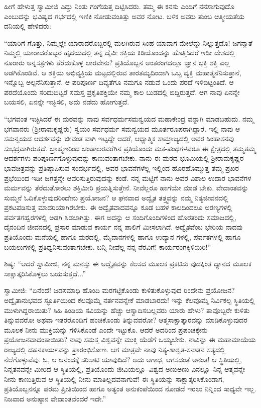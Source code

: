 ಹೀಗೆ ಹೇಳುತ್ತ ಸ್ವಾಮೀಜಿ ಎದ್ದು ನಿಂತು ಗಂಗೆಯತ್ತ ದಿಟ್ಟಿಸಿದರು. ತಮ್ಮ ಈ ಕನಸು ಎಂದಿಗೆ ನನಸಾಗುವುದೊ ಎಂಬುದನ್ನು ಭವಿಷ್ಯದ ಗರ್ಭದಲ್ಲಿ ಇಣಿಕಿ ನೋಡುವಂತಿತ್ತು ಅವರ ನೋಟ. ಬಳಿಕ ಅವರು ತುಂಬ ಆತ್ಮೀಯತೆಯ ದನಿಯಲ್ಲಿ ಹೇಳಿದರು:

“ಯಾರಿಗೆ ಗೊತ್ತು, ನಿಮ್ಮಲ್ಲೇ ಯಾರಾದರೊಬ್ಬರಲ್ಲಿ ಮಲಗಿರುವ ಸಿಂಹ ಯಾವಾಗ ಮೇಲೆದ್ದು ನಿಲ್ಲುತ್ತದೊ! ಜಗನ್ಮಾತೆ ನಿಮ್ಮಲ್ಲಿ ಯಾರಾದರೊಬ್ಬರ ಹೃದಯದಲ್ಲಿ ತನ್ನ ದೈವೀ ಶಕ್ತಿಯ ಕಿಡಿಯೊಂದನ್ನು ಹೊತ್ತಿಸಿದರೆ ಇಡೀ ದೇಶದಲ್ಲಿ ನೂರಾರು ಅನ್ನಸತ್ರಗಳು ತೆರೆದುಕೊಳ್ಳ ಲಾರವೇನು? ಪ್ರತಿಯೊಬ್ಬನ ಅಂತರಂಗದಲ್ಲೂ ಜ್ಞಾನ ಭಕ್ತಿ ಶಕ್ತಿ ಎಲ್ಲ ಅಡಗಿಕೊಂಡಿವೆ. ಆ ಶಕ್ತಿಯ ಅಭಿವ್ಯಕ್ತಿಯ ಮಟ್ಟದಲ್ಲಿರುವ ತಾರತಮ್ಯದಿಂದಾಗಿ ಒಬ್ಬ ವ್ಯಕ್ತಿ ಮಹಾತ್ಮನೆನಿಸುತ್ತಾನೆ, ಇನ್ನೊಬ್ಬ ಅಲ್ಪನೆನಿಸುತ್ತಾನೆ. ಆ ಪರಿಪೂರ್ಣ ದಿವ್ಯತೆಗೂ ನಮಗೂ ನಡುವೆ ಒಂದು ಪರದೆ ಇಳಿಬಿಟ್ಟಂತಿದೆ. ಆ ಪರದೆಯೊಂದು ಸರಿದುಬಿಟ್ಟರೆ ಸಮಸ್ತ ಪ್ರಕೃತಿಶಕ್ತಿಯೇ ನಮ್ಮ ಕಾಲ ಬುಡದಲ್ಲಿ ಬಿದ್ದಿರುತ್ತದೆ. ಆಗ ನಾವು ಏನನ್ನೇ ಬಯಸಲಿ, ಏನನ್ನೇ ಇಚ್ಛಿಸಲಿ, ಅದು ನಡೆದು ಹೋಗುತ್ತದೆ.

“ಭಗವಂತ ಇಚ್ಛಿಸಿದರೆ ಈ ಮಠವನ್ನು ನಾವು ಸರ್ವಧರ್ಮಸಮನ್ವಯದ ಮಹಾಕೇಂದ್ರ ವನ್ನಾಗಿ ಮಾಡಬಹುದು. ನಮ್ಮ ಭಗವಾನರು (ಶ್ರೀರಾಮಕೃಷ್ಣರು) ಸ್ವಯಂ ಸರ್ವಧರ್ಮ ಸಮನ್ವಯದ ಮೂರ್ತರೂಪರಾಗಿದ್ದಾರೆ. ಇಲ್ಲಿ ನಾವು ಆ ಸಮನ್ವಯದ ಆದರ್ಶವನ್ನು ಜೀವಂತ ವಾಗಿ ಇಟ್ಟದ್ದೇ ಆದರೆ, ಆಧ್ಯಾತ್ಮಿಕ ಸಾಮ್ರಾಜ್ಯದಲ್ಲಿ ಅವರ ಸಿಂಹಾಸನವು ಸುಭದ್ರವಾಗಿರುತ್ತದೆ. ಬ್ರಾಹ್ಮಣರಿಂದ ಚಂಡಾಲರವರೆಗಿನ ಪ್ರತಿಯೊಂದು ಮತ-ಪಂಥಗಳವರೂ ಈ ಕ್ಷೇತ್ರದಲ್ಲಿ ತಮ್ಮತಮ್ಮ ಆದರ್ಶಗಳು ಪರಿಪೂರ್ಣಗೊಳ್ಳುವುದನ್ನು ಕಾಣುವಂತಾಗಬೇಕು. ನಾನು ಈ ಮಠದ ಭೂಮಿಯಲ್ಲಿ ಶ್ರೀರಾಮಕೃಷ್ಣರ ಭಾವಚಿತ್ರವನ್ನು ಪ್ರತಿಷ್ಠಾಪಿಸುವ ಸಂದರ್ಭದಲ್ಲಿ, ಅವರ ಭಾವನೆಗಳೆಲ್ಲ ಇಲ್ಲಿಂದ ಹೊರಹೊಮ್ಮುತ್ತ ತಮ್ಮ ಪ್ರಖರ ಪ್ರಭೆಯಿಂದ ಇಡೀ ಜಗತ್ತನ್ನೇ ಆವರಿಸುತ್ತಿರುವುದನ್ನು ಕಂಡೆ. ನನ್ನ ಮಟ್ಟಿಗೆ ನಾನು ಅವರ ವಿಶಾಲ ಉದಾರ ಭಾವನೆಗಳ ಮರ್ಮವನ್ನು ತೆರೆದುತೋರಲು ಶಕ್ತಿಮೀರಿ ಪ್ರಯತ್ನಿಸುತ್ತೇನೆ. ನೀವೆಲ್ಲರೂ ಹಾಗೆಯೇ ಮಾಡ ಬೇಕು. ವೇದಾಂತವನ್ನು ಸುಮ್ಮನೆ ಓದಿಕೊಳ್ಳುವುದರಿಂದೇನು ಪ್ರಯೋಜನ? ಆ ಘನವಾದ ಅದ್ವೈತ ತತ್ತ್ವವನ್ನು ನಮ್ಮ ನಿತ್ಯಜೀವನದಲ್ಲಿ ಪ್ರಕಟಪಡಿಸುತ್ತ ಮಾದರಿಯಾಗಿರಬೇಕು. ಈ ಅದ್ವೈತವಾದವನ್ನೂ ಕೂಡ ಬಹಳ ಕಾಲದಿಂದಲೂ ಅರಣ್ಯಗಳಲ್ಲಿ ಪರ್ವತಗಹ್ವರಗಳಲ್ಲಿ ಅಡಗಿ ಸಿಡಲಾಗಿತ್ತು. ಈಗ ಅದನ್ನು ಆ ಸಂದಿಗೊಂದಿಗಳಿಂದ ಹೊರತಂದು ಸಮಾಜದಲ್ಲಿ, ದೈನಂದಿನ ಜೀವನದಲ್ಲಿ ಪ್ರಸಾರ ಮಾಡುವ ಕಾರ್ಯ ನನ್ನ ಪಾಲಿಗೆ ಮೀಸಲಾಗಿದೆ. ಅದ್ವೈತವೆಂಬ ಭೇರಿಯ ನಾದವು ಪ್ರತಿಯೊಂದು ಮನೆಯಲ್ಲಿ ಹಾಗೂ ಮಠದಲ್ಲಿ, ಮೈದಾನಗಳಲ್ಲಿ ಹಾಗೂ ಉದ್ಯಾನ ಗಳಲ್ಲಿ, ಪರ್ವತಗಳಲ್ಲಿ ಹಾಗೂ ಬಯಲುಗಳಲ್ಲಿ ಪ್ರತಿಧ್ವನಿಸುವಂತಾಗಬೇಕು. ಬನ್ನಿ ನೀವೆಲ್ಲ ನನ್ನ ನೆರವಿಗೆ! ಕಾರ್ಯರಂಗಕ್ಕಿಳಿಯಿರಿ!”

ಶಿಷ್ಯ: “ಆದರೆ ಸ್ವಾಮೀಜಿ, ನನ್ನ ಮನಸ್ಸು ಈ ಅದ್ವೈತವನ್ನು ಕೆಲಸದ ಮೂಲಕ ಪ್ರಕಟಿಸು ವುದಕ್ಕಿಂತ ಧ್ಯಾನದ ಮೂಲಕ ಸಾಕ್ಷಾತ್ಕರಿಸಿಕೊಳ್ಳಲು ಬಯಸುತ್ತದೆ...”

ಸ್ವಾಮೀಜಿ: “ಏನೆಂದೆ! ಜಡಸಮಾಧಿ ಹೊಂದಿ ಮರಗಟ್ಟಿಕೊಂಡು ಕುಳಿತುಕೊಳ್ಳುವುದ ರಿಂದೇನು ಪ್ರಯೋಜನ? ಅದ್ವೈತಾನುಭವದ ಸ್ಫೂರ್ತಿಯಿಂದ ಕೆಲವೊಮ್ಮೆ ನರ್ತನವನ್ನೇಕೆ ಮಾಡಬಾರದು! ಇನ್ನು ಕೆಲವೊಮ್ಮೆ ನಿರ್ವಿಕಲ್ಪ ಸ್ಥಿತಿಯಲ್ಲಿ ಮುಳುಗಿದ್ದರಾಯಿತು? ಸಿಹಿ ತಿಂಡಿಯ ಸವಿಯನ್ನು ಹೆಚ್ಚು ಆಸ್ವಾದಿಸಬಲ್ಲವರು ಯಾರು ಹೇಳು? ತಾವೊಬ್ಬರೇ ಕುಳಿತು ತಿನ್ನುವವರೋ ಅಥವಾ ಇತರರೊಂದಿಗೆ ಹಂಚಿಕೊಂಡು ತಿನ್ನುವವರೋ? ಆತ್ಮಸಾಕ್ಷಾತ್ಕಾರವನ್ನು ಮಾಡಿಕೊಳ್ಳುವುದರ ಮೂಲಕ ನೀನು ಮುಕ್ತಿಯನ್ನು ಗಳಿಸಿಕೊಂಡೆ ಎಂದೇ ಇಟ್ಟುಕೊ. ಆದರೆ ಅದರಿಂದ ಪ್ರಪಂಚಕ್ಕೇನು ಪ್ರಯೋಜನವಾದಂತಾಯಿತು? ನಾವು ಸಮಸ್ತ ವಿಶ್ವವನ್ನೇ ಮುಕ್ತಿ ಯೆಡೆಗೆ ಒಯ್ಯಬೇಕು. ನಾವಿನ್ನು ಈ ಮಹಾಮಾಯೆಯ ರಾಜ್ಯದಲ್ಲಿ ದಹನಕಾರ್ಯವನ್ನು ಪ್ರಾರಂಭಿಸೋಣ. ಆಗ ಮಾತ್ರವೇ ನಾವು ನಿತ್ಯ-ಶಾಶ್ವತ-ಸನಾತನ ಸತ್ಯದಲ್ಲಿ ನೆಲೆಗೊಳ್ಳುವೆವು. ಓ, ಆ ಆನಂದಕ್ಕೆ ಸರಿಸಾಟಿ ಯಾವುದಿದೆ? ಅದು ಅಗಾಧ, ಆಗಸದಂತೆ ಅನಂತ! ಆ ಸ್ಥಿತಿಯಲ್ಲಿ, ನಿನ್ನತನವನ್ನೇ ಮೀರಿದ ಆ ಸ್ಥಿತಿಯಲ್ಲಿ, ಪ್ರತಿಯೊಂದು ಜೀವಿಯಲ್ಲೂ–ವಿಶ್ವದ ಅಣುಅಣು ವಿನಲ್ಲೂ–ನಿನ್ನ ಆತ್ಮವನ್ನೇ ನೀನು ಕಾಣುತ್ತಿರುವ ಆ ಸ್ಥಿತಿಯಲ್ಲಿ ನೀನು ಮಾತಿಲ್ಲದವನಾಗುವೆ! ಈ ಸ್ಥಿತಿಯನ್ನು ಸಾಕ್ಷಾತ್ಕರಿಸಿಕೊಂಡಾಗ, ಪ್ರತಿಯೊಬ್ಬನನ್ನೂ ಪರಮ ಪ್ರೀತಿಯಿಂದ ಹಾಗೂ ಅತ್ಯಂತ ಅನುಕಂಪೆಯಿಂದ ನೋಡದೆ ಇರಲು ನಿನ್ನಿಂದ ಸಾಧ್ಯವೇ ಇಲ್ಲ. ನಿಜವಾದ ಅನುಷ್ಠಾನ ವೇದಾಂತವೆಂದರೆ ಇದೇ.”

